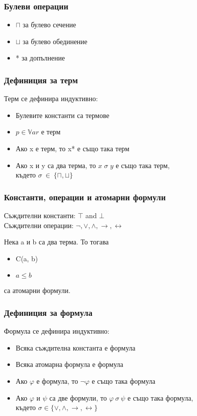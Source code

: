 \documentclass{beamer}
\begin{document}
\begin{frame}\frametitle{Булеви операции}
	\begin{itemize}
		\item $\sqcap$ за булево сечение
		\item $\sqcup$ за булево обединение
		\item * за допълнение
	\end{itemize}
\end{frame}

\begin{frame}\frametitle{Дефиниция за терм}
Терм се дефинира индуктивно:
	\begin{itemize}
		\item Булевите константи са термове
		\item $p \in \mathbb{V}ar$ е терм
		\item Ако x е терм, то x* е също така терм
		\item Ако x и y са два терма, то $x \; \sigma \; y $ е също така терм,\\
				където $\sigma \: \in \: \{\sqcap, \sqcup\}$
	\end{itemize}
\end{frame}

\begin{frame}\frametitle{Константи, операции и атомарни формули}
	Съждителни константи: $\top$ and $\bot$ \\
	\vspace{10px}
	Съждителни операции: $\neg, \vee, \wedge, \rightarrow, \leftrightarrow$
	\vspace{10px}

	Нека a и b са два терма. То тогава 
	\begin{itemize}
		\item C(a, b)
		\item $a \le b$
	\end{itemize}
	са атомарни формули.
\end{frame}

\begin{frame}\frametitle{Дефиниция за формула}
Формула се дефинира индуктивно:
		\begin{itemize}
			\item Всяка съждителна константа е формула
			\item Всяка атомарна формула е формула
			\item Ако $\varphi$ е формула, то $\neg{\varphi}$ е също така формула
			\item Ако $\varphi$ и $\psi$ са две формули, то $\varphi \: \sigma \: \psi $ е също така формула,\\
				където $\sigma \in \{\vee, \wedge, \rightarrow, \leftrightarrow\}$
		\end{itemize}
\end{frame}
\end{document}
